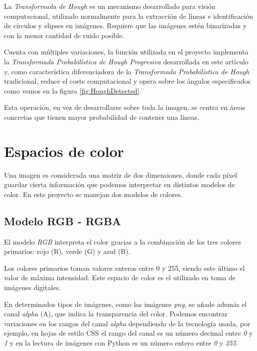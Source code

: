 La \textit{Transformada de Hough} es un mecanismo desarrollado para visión computacional, utilizado normalmente para la extracción de líneas e identificación de círculos y elipses en imágenes. Requiere que las imágenes estén binarizadas y con la menor cantidad de ruido posible.

Cuenta con múltiples variaciones, la función utilizada en el proyecto \cite{skimage:HoughLine} implementa la \textit{Transformada Probabilística de Hough Progresiva} desarrollada en este artículo \cite{galamhos1999progressiveHough} y, como característica diferenciadora de la \textit{Transformada Probabilística de Hough} tradicional, reduce el coste computacional y opera sobre los ángulos especificados como vemos en la figura \ref{fig:HoughDetected}. 


Esta operación, en vez de desarrollarse sobre toda la imagen, se centra en áreas concretas que tienen mayor probabilidad de contener una líneas.

\newpage
\section{Espacios de color} \label{ct:EspaciosColor}
Una imagen es considerada una matriz de dos dimensiones, donde cada píxel guardar cierta información que podemos interpretar en distintos modelos de color. En este proyecto se manejan dos modelos de colores.

\subsection{Modelo RGB - RGBA}
El modelo \textit{RGB} \cite{wiki:RGB} interpreta el color gracias a la combinación de los tres colores primarios: rojo (R), verde (G) y azul (B). 

Los colores primarios toman valores enteros entre 0 y 255, siendo este último el valor de máxima intensidad. Este espacio de color es el utilizado en toma de imágenes digitales.

En determinados tipos de imágenes, como las imágenes \textit{png}, se añade además el canal \textit{alpha} (A), que indica la transparencia del color. Podemos encontrar variaciones en los rangos del canal \textit{alpha} dependiendo de la tecnología usada, por ejemplo, en hojas de estilo CSS el rango del canal es un número decimal entre \textit{0} y \textit{1} y en la lectura de imágenes con Python es un número entero entre \textit{0} y \textit{255}.


